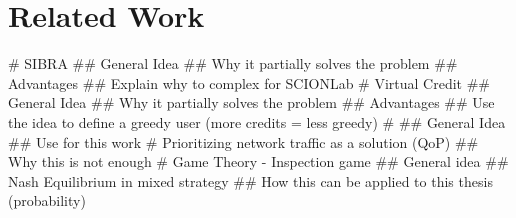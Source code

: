 \documentclass[thesis.tex]{subfiles}
\begin{document}
\chapter{Related Work}\label{chap:prevwork}

\begin{easylist}
    \MyListProperties
    # SIBRA \cite{Basescu.2016}
    ## General Idea
    ## Why it partially solves the problem
    ## Advantages
    ## Explain why to complex for SCIONLab
    # Virtual Credit \cite{DennisMeyer.2017}
    ## General Idea
    ## Why it partially solves the problem
    ## Advantages
    ## Use the idea to define a greedy user (more credits = less greedy)
    # \cite{Zhu.2014}
    ## General Idea
    ## Use for this work
    # Prioritizing network traffic as a solution (QoP)
    ## Why this is not enough 
    # Game Theory - Inspection game
    ## General idea
    ## Nash Equilibrium in mixed strategy
    ## How this can be applied to this thesis (probability)
\end{easylist}

\subfilebib %
\end{document}
